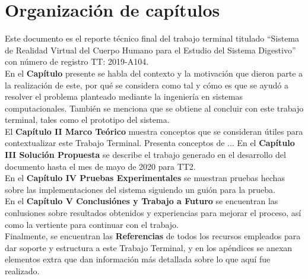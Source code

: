 \section{Organización de capítulos}
Este documento es el reporte técnico final del trabajo terminal titulado “Sistema de Realidad Virtual del Cuerpo Humano para el Estudio del Sistema Digestivo” con número de registro TT: 2019-A104.\\
En el \textbf{Capítulo} presente se habla del contexto y la motivación que dieron parte a la realización  de este, por qué se considera como tal y cómo es que se ayudó a resolver el problema planteado mediante la ingeniería en sistemas computacionales. También se menciona que se obtiene al concluir con este trabajo terminal, tales como el prototipo del sistema.\\
El \textbf{Capítulo II Marco Teórico} muestra conceptos que se consideran útiles para contextualizar este Trabajo Terminal. Presenta conceptos de ...%
En el \textbf{Capítulo III Soluci\'on Propuesta} se describe el trabajo generado en el desarrollo del documento hasta el mes de mayo de 2020 para TT2.\\
En el \textbf{Capítulo IV Pruebas Experimentales} se muestran pruebas hechas sobre las implementaciones del sistema siguiendo un guión para la prueba.\\ 
En el \textbf{Capítulo V Conclusiónes y Trabajo a Futuro} se encuentran las conlusiones sobre resultados obtenidos y experiencias para mejorar el proceso, así como la vertiente para continuar con el trabajo.\\
Finalmente, se encuentran las \textbf{Referencias} de todos los recursos empleados para dar soporte y estructura a este Trabajo Terminal, y en los apéndices se anexan elementos extra que dan información más detallada sobre lo que aquí fue realizado.\\
